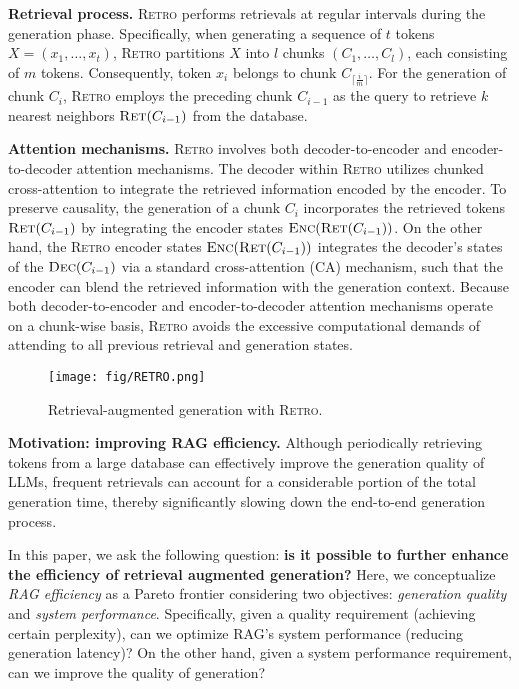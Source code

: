 \textbf{Retrieval process.}  \textsc{Retro} performs retrievals at regular intervals during the generation phase. Specifically, when generating a sequence of $t$ tokens \( X = (x_1, \ldots, x_t) \), \textsc{Retro} partitions \( X \) into \( l \) chunks \( (C_1, \ldots, C_l) \), each consisting of \( m \) tokens. Consequently, token \( x_{i} \) belongs to chunk \( C_{\lceil \frac{i}{m} \rceil} \). For the generation of chunk \( C_i \), \textsc{Retro} employs the preceding chunk \( C_{i-1} \) as the query to retrieve \( k \) nearest neighbors \( \textsc{Ret}(C_{i-1}) \) from the database.

\textbf{Attention mechanisms.} 
\textsc{Retro} involves both decoder-to-encoder and encoder-to-decoder attention mechanisms. 
The decoder within \textsc{Retro} utilizes chunked cross-attention to integrate the retrieved information encoded by the encoder. To preserve causality, the generation of a chunk $C_i$ incorporates the retrieved tokens \( \textsc{Ret}(C_{i-1})\) by integrating the encoder states \( \textsc{Enc}(\textsc{Ret}(C_{i-1}))\).
On the other hand, the \textsc{Retro} encoder states \( \textsc{Enc}(\textsc{Ret}(C_{i-1}))\) integrates the decoder's states of the \( \textsc{Dec}(C_{i-1}) \) via a standard cross-attention (CA) mechanism, such that the encoder can blend the retrieved information with the generation context.
Because both decoder-to-encoder and encoder-to-decoder attention mechanisms operate on a chunk-wise basis, \textsc{Retro} avoids the excessive computational demands of attending to all previous retrieval and generation states.

\begin{figure}%
	\centering
  \texttt{[image: fig/RETRO.png]}
  \vspace{-1em}
  \caption{Retrieval-augmented generation with \textsc{Retro}.}
  \vspace{-2em}
  \label{fig:retro}
\end{figure}

\textbf{Motivation: improving RAG efficiency.}
Although periodically retrieving tokens from a large database can effectively improve the generation quality of LLMs, frequent retrievals can account for a considerable portion of the total generation time, thereby significantly slowing down the end-to-end generation process.

In this paper, we ask the following question: \textbf{is it possible to further enhance the efficiency of retrieval augmented generation?} Here, we conceptualize \textit{RAG efficiency} as a Pareto frontier considering two objectives: \textit{generation quality} and \textit{system performance}. 
Specifically, given a quality requirement (achieving certain perplexity), can we optimize RAG's system performance (reducing generation latency)? On the other hand, given a system performance requirement, can we improve the quality of generation? 

